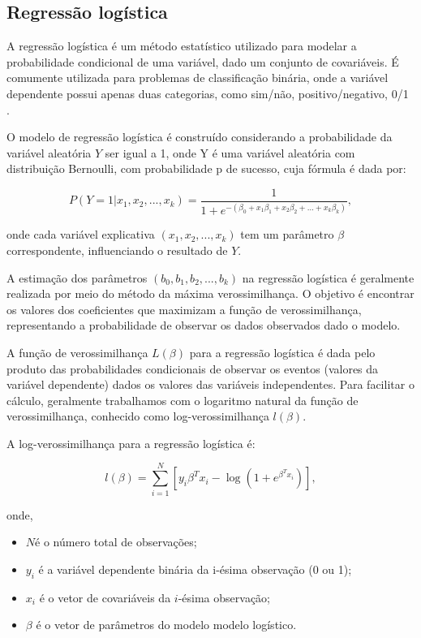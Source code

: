 
 \subsection{Regressão logística}
 A regressão logística é um método estatístico utilizado para modelar a probabilidade condicional de uma variável,
 dado um conjunto de covariáveis. É comumente utilizada para problemas de classificação binária, onde a variável
dependente possui apenas duas categorias, como sim/não, positivo/negativo, 0/1 \cite{hosmer}.


O modelo de regressão logística é construído considerando a probabilidade da variável aleatória $Y$ ser igual a 1, onde Y é 
uma variável aleatória com distribuição Bernoulli, com probabilidade p de sucesso, cuja fórmula é dada por:

\begin{equation}
  P(Y=1| x_1, x_2, ..., x_k) = \frac{1}{1 + e^{-(\beta_0 + x_{1}\beta_1 + x_{2}\beta_2 + \ldots + x_{k}\beta_k)}},
  \label{eq:model_logistic}
\end{equation}

\noindent onde cada variável explicativa $(x_1, x_2, ..., x_k)$ tem um parâmetro $\beta$ correspondente, influenciando o resultado de $Y$.

A estimação dos parâmetros $(b_0, b_1, b_2, ..., b_k)$  na regressão logística é geralmente realizada por meio 
do método da máxima verossimilhança. O objetivo é encontrar os valores dos coeficientes que maximizam a função de
verossimilhança, representando a probabilidade de observar os dados observados dado o modelo.
 
A função de verossimilhança $L(\beta)$ para a regressão logística é dada pelo produto das probabilidades condicionais
de observar os eventos (valores da variável dependente) dados os valores das variáveis independentes. Para facilitar o cálculo, 
geralmente trabalhamos com o logaritmo natural da função de verossimilhança, conhecido como log-verossimilhança $l(\beta)$.

A log-verossimilhança para a regressão logística é:

\begin{equation}
  l(\beta) = \sum_{i=1}^{N} [y_i \beta^T x_i - \log(1 + e^{\beta^T x_i})], 
\end{equation}

\noindent onde,
\begin{itemize}
  \item  $N$é o número total de observações;
  \item  $y_i$ é a variável dependente binária da i-ésima observação (0 ou 1);
  \item $x_i$ é o vetor de covariáveis da $i$-ésima observação;
  \item \textbf{$\beta$} é o vetor de parâmetros do modelo modelo logístico.
\end{itemize}

